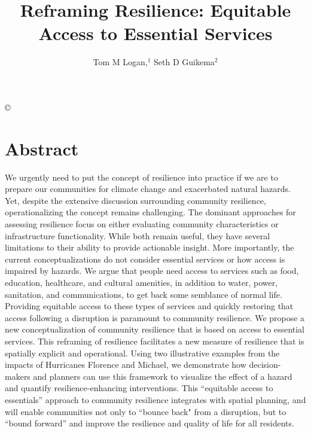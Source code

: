 \documentclass[onecolumn,doublespacing]{risa}
\begin{document}
\jvol{}
\jnum{}
\pubyear{}

\doi{}
\copyright{}
\issnyear{}

\title{Reframing Resilience: Equitable Access to Essential Services}

\author[Logan]{Tom M Logan,$^{1}$
%
Seth D Guikema$^{2}$
}

\maketitle
\newpage

\section*{Abstract}
We urgently need to put the concept of resilience into practice if we are to prepare our communities for climate change and exacerbated natural hazards.
Yet, despite the extensive discussion surrounding community resilience, operationalizing the concept remains challenging. 
The dominant approaches for assessing resilience focus on either evaluating community characteristics or infrastructure functionality. 
While both remain useful, they have several limitations to their ability to provide actionable insight.
More importantly, the current conceptualizations do not consider essential services or how access is impaired by hazards. 
We argue that people need access to services such as food, education, healthcare, and cultural amenities, in addition to water, power, sanitation, and communications, to get back some semblance of normal life.
Providing equitable access to these types of services and quickly restoring that access following a disruption is paramount to community resilience. 
We propose a new conceptualization of community resilience that is based on access to essential services.
This reframing of resilience facilitates a new measure of resilience that is spatially explicit and operational. 
Using two illustrative examples from the impacts of Hurricanes Florence and Michael, we demonstrate how decision-makers and planners can use this framework to visualize the effect of a hazard and quantify resilience-enhancing interventions. 
This ``equitable access to essentials'' approach to community resilience integrates with spatial planning, and will enable communities not only to ``bounce back" from a disruption, but to ``bound forward'' and improve the resilience and quality of life for all residents.
\end{document}
